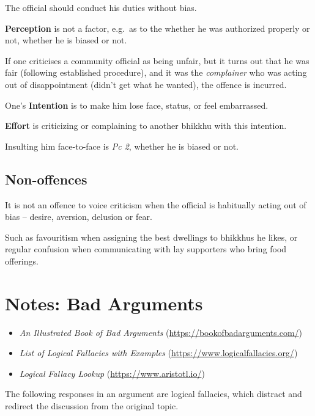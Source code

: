 The official should conduct his duties without bias.

\textbf{Perception} is not a factor, e.g.~as to the whether he was
authorized properly or not, whether he is biased or not.

\clearpage

If one criticises a community official as being unfair, but it turns out
that he was fair (following established procedure), and it was the
\emph{complainer} who was acting out of disappointment (didn't get what
he wanted), the offence is incurred.

One's \textbf{Intention} is to make him lose face, status, or feel
embarrassed.

\textbf{Effort} is criticizing or complaining to another bhikkhu with
this intention.

Insulting him face-to-face is \emph{Pc 2}, whether he is biased or not.

\subsection{Non-offences}

It is not an offence to voice criticism when the official is habitually
acting out of bias -- desire, aversion, delusion or fear.

Such as favouritism when assigning the best dwellings to bhikkhus he
likes, or regular confusion when communicating with lay supporters who
bring food offerings.

\bigskip

\section{Notes: Bad Arguments}

\bigskip

\begin{itemize}
\tightlist
\item
  \emph{An Illustrated Book of Bad Arguments}
  (\url{https://bookofbadarguments.com/})
\item
  \emph{List of Logical Fallacies with Examples}
  (\url{https://www.logicalfallacies.org/})
\item
  \emph{Logical Fallacy Lookup} (\url{https://www.aristotl.io/})
\end{itemize}

\bigskip

The following responses in an argument are logical fallacies, which
distract and redirect the discussion from the original topic.

